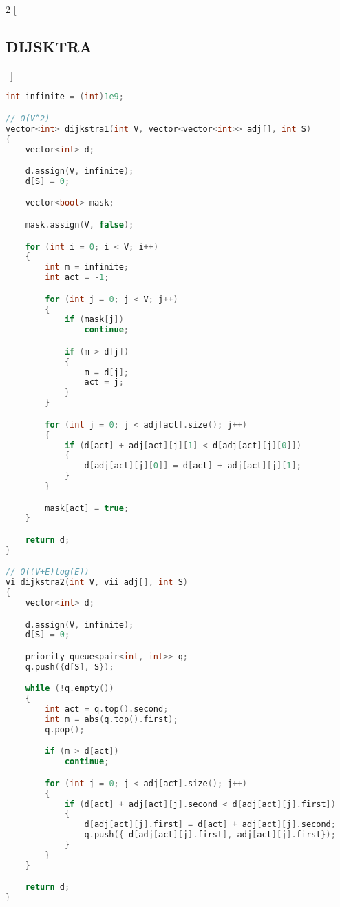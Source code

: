 \documentclass[leter]{amsart}
\begin{document}
\begin{multicols}{2}
[\subsection{DIJSKTRA}\ ]
\begin{lstlisting}[language=C++]
int infinite = (int)1e9;

// O(V^2)
vector<int> dijkstra1(int V, vector<vector<int>> adj[], int S)
{
    vector<int> d;

    d.assign(V, infinite);
    d[S] = 0;

    vector<bool> mask;

    mask.assign(V, false);

    for (int i = 0; i < V; i++)
    {
        int m = infinite;
        int act = -1;

        for (int j = 0; j < V; j++)
        {
            if (mask[j])
                continue;

            if (m > d[j])
            {
                m = d[j];
                act = j;
            }
        }

        for (int j = 0; j < adj[act].size(); j++)
        {
            if (d[act] + adj[act][j][1] < d[adj[act][j][0]])
            {
                d[adj[act][j][0]] = d[act] + adj[act][j][1];
            }
        }

        mask[act] = true;
    }

    return d;
}

// O((V+E)log(E))
vi dijkstra2(int V, vii adj[], int S)
{
    vector<int> d;

    d.assign(V, infinite);
    d[S] = 0;

    priority_queue<pair<int, int>> q;
    q.push({d[S], S});

    while (!q.empty())
    {
        int act = q.top().second;
        int m = abs(q.top().first);
        q.pop();

        if (m > d[act])
            continue;

        for (int j = 0; j < adj[act].size(); j++)
        {
            if (d[act] + adj[act][j].second < d[adj[act][j].first])
            {
                d[adj[act][j].first] = d[act] + adj[act][j].second;
                q.push({-d[adj[act][j].first], adj[act][j].first});
            }
        }
    }

    return d;
}

\end{lstlisting}
\end{multicols}
\end{document}
